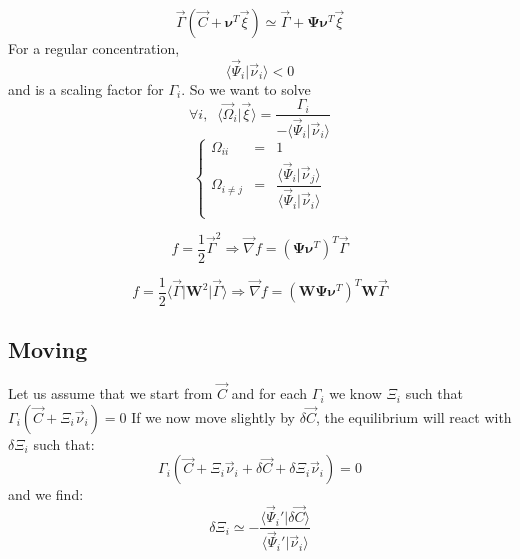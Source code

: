 \documentclass[aps,12pt]{revtex4}
\begin{document}
\begin{equation}
	\vec{\Gamma}(\vec{C}+\bm{\nu}^T \vec{\xi}) \simeq \vec{\Gamma} + \bm{\Psi} \bm{\nu}^T \vec{\xi}
\end{equation}
For a regular concentration,
\begin{equation}
	\langle\vec{\Psi}_i \vert \vec{\nu}_i\rangle < 0
\end{equation}
and is a scaling factor for $\Gamma_i$. So we want to solve
\begin{equation}
	\forall i, \;\; \langle \vec{\Omega}_i \vert \vec{\xi} \rangle = \dfrac{\Gamma_i}{-\langle\vec{\Psi}_i \vert \vec{\nu}_i\rangle}
\end{equation}
\begin{equation}
\left\lbrace
	\begin{array}{rcl}
	\Omega_{ii}   & = & 1\\
	\Omega_{i\not=j} & = & \dfrac{\langle\vec{\Psi}_i \vert \vec{\nu}_j\rangle}{\langle\vec{\Psi}_i \vert \vec{\nu}_i\rangle}\\
	\end{array}
\right.
\end{equation}

\begin{equation}
	f = \dfrac{1}{2} \vec{\Gamma}^2 \Rightarrow \vec{\nabla} f = \left(\bm{\Psi} \bm{\nu}^T\right)^T \vec{\Gamma}
\end{equation}

\begin{equation}
	f = \dfrac{1}{2} \langle \vec{\Gamma} \vert \bm{W}^2 \vert \vec{\Gamma} \rangle \Rightarrow \vec{\nabla} f = \left(\bm{W}\bm{\Psi} \bm{\nu}^T\right)^T \bm{W}\vec{\Gamma}
\end{equation}

\subsection{Moving}

Let us assume that we start from $\vec{C}$ and for each $\Gamma_i$ we know $\Xi_i$ such that $\Gamma_i(\vec{C} + \Xi_i \vec{\nu}_i) =0$
If we now move slightly by $\delta\vec{C}$, the equilibrium will react with $\delta\Xi_i$ such that:
\begin{equation}
	\Gamma_i(\vec{C} + \Xi_i \vec{\nu}_i + \delta\vec{C} + \delta\Xi_i \vec{\nu}_i) = 0
\end{equation}
and we find:
\begin{equation}
	\delta \Xi_i \simeq - \dfrac{\langle \vec{\Psi}_i' \vert \delta\vec{C}\rangle}{\langle \vec{\Psi}_i' \vert \vec{\nu}_i \rangle}
\end{equation}
 
\end{document}
